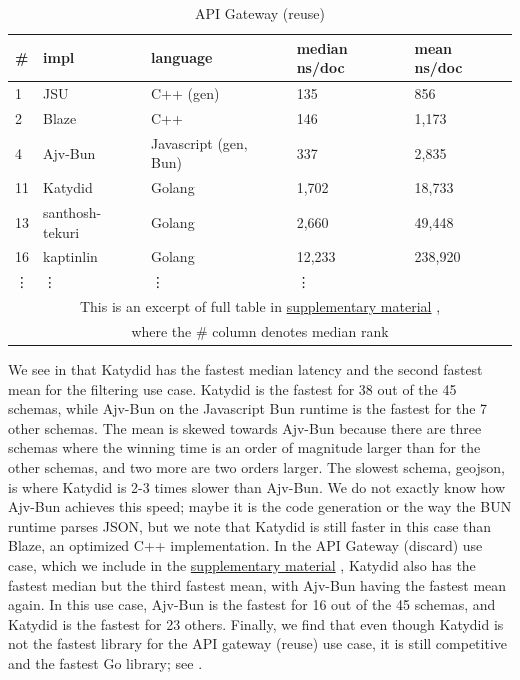 \documentclass[acmsmall,%
  screen,%
  authorversion, %
  nonacm%
]{acmart}
\newcommand{\supplementarymaterial}{%
  \hyperref[supplementary_material]{supplementary material}\xspace%
}
\begin{document}
\begin{table}
\caption{API Gateway (reuse)}
\label{table_api_gateway_reuse}
\begin{tabular}{ll|l|ll}
\midrule
\# & impl & language & median ns/doc & mean ns/doc \\
\midrule
1 & JSU & C++ (gen) & 135 & 856 \\
2 & Blaze & C++ & 146 & 1,173 \\
4 & Ajv-Bun & Javascript (gen, Bun) & 337 & 2,835 \\
11 & Katydid & Golang & 1,702 & 18,733 \\
13 & santhosh-tekuri & Golang & 2,660 & 49,448 \\
16 & kaptinlin & Golang & 12,233 & 238,920 \\
\vdots & \vdots & \vdots & \vdots \\
\multicolumn{5}{c}{This is an excerpt of full table in \supplementarymaterial,}\\
\multicolumn{5}{c}{where the \# column denotes median rank} \\
\end{tabular}
\end{table}

We see in  that Katydid has the fastest median latency and the second fastest mean for the filtering use case.
Katydid is the fastest for 38 out of the 45 schemas, while Ajv-Bun on the Javascript
Bun runtime is the fastest for the 7 other schemas.
The mean is skewed towards Ajv-Bun because there are three schemas where the winning time is an order of magnitude larger than for the other schemas, and two more are two orders larger.
The slowest schema, geojson, is where Katydid is 2-3 times slower than Ajv-Bun.
We do not exactly know how Ajv-Bun achieves this speed; maybe it is the code generation or the way the BUN runtime parses JSON, but we note that Katydid is still faster in this case than Blaze, an optimized C++ implementation.
In the API Gateway (discard) use case, which we include in the \supplementarymaterial, Katydid also has the fastest median but the third fastest mean, with Ajv-Bun having the fastest mean again.
In this use case, Ajv-Bun is the fastest for 16 out of the 45 schemas, and Katydid is the fastest for 23 others.
Finally, we find that even though Katydid is not the fastest library for the API gateway (reuse) use case, it is still competitive and the fastest Go library; see .
\end{document}
